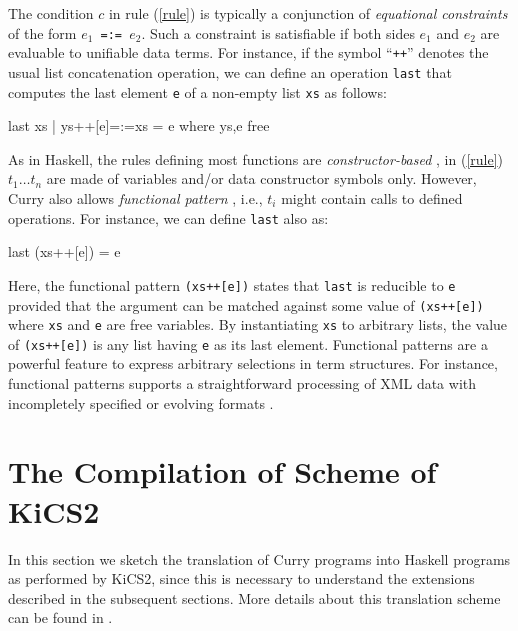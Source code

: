 \documentclass{llncs}
\newcommand{\code}[1]{\mbox{\small\texttt{#1}}}
\begin{document}
The condition $c$ in rule (\ref{rule}) is typically a
conjunction of \emph{equational constraints}
of the form \code{$e_1$\,=:=\,$e_2$}.
Such a constraint is satisfiable if
both sides $e_1$ and $e_2$ are evaluable to unifiable data terms.
For instance, if the symbol ``\code{++}'' denotes the usual list
concatenation operation, we can define an operation \code{last}
that computes the last element \code{e} of a non-empty list \code{xs}
as follows:
%
\label{ex:last}
\begin{curry}
  last xs | ys++[e]=:=xs = e   where ys,e free  
\end{curry}
%
As in Haskell, the rules defining most functions are
\emph{constructor-based} \cite{ODonnell85}, in (\ref{rule}) $t_1
\ldots t_n$ are made of variables and/or data constructor symbols
only.  However, Curry also allows \emph{functional pattern}
\cite{AntoyHanus05LOPSTR}, i.e., $t_i$ might contain calls to
defined operations.  For instance, we can define \code{last} also
as:
%
\begin{curry}
  last (xs++[e]) = e 
\end{curry}
%
Here, the functional pattern \code{(xs++[e])}
states that \code{last} is reducible
to \code{e} provided that the argument can be matched against
some value of \code{(xs++[e])} where \code{xs} and \code{e} are
free variables.
By instantiating \code{xs} to arbitrary lists, the value
of \code{(xs++[e])} is any list having \code{e} as its last element.
Functional patterns are
a powerful feature to express arbitrary selections in term structures.
For instance, functional patterns supports a straightforward
processing of XML data with incompletely specified
or evolving formats \cite{Hanus11ICLP}.



\section{The Compilation of Scheme of KiCS2}
\label{sec:Compilation}

In this section we sketch the translation of Curry programs
into Haskell programs as performed by KiCS2,
since this is necessary to understand the extensions
described in the subsequent sections.
More details about this translation scheme can be found in
\cite{BrasselFischer08IFL,BrasselFischerHanusReck11}.
\end{document}
